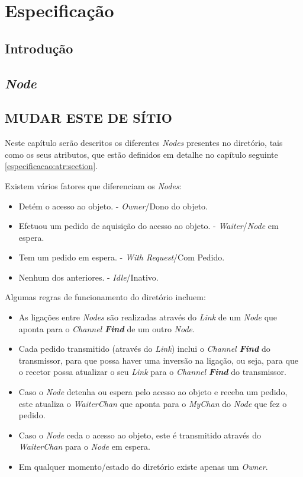 \chapter{Especificação}
\label{chap:especificacao}

\section{Introdução}
\label{especificacao:sec:intro}
\section{\emph{Node}}



\section{MUDAR ESTE DE SÍTIO}
Neste capítulo serão descritos os diferentes \emph{Nodes} presentes no diretório, tais como os seus atributos, 
que estão definidos em detalhe no capítulo seguinte \ref{especificacao:atr:section}.

Existem vários fatores que diferenciam os \emph{Nodes}: 
\begin{itemize}
    \item Detém o acesso ao objeto. - \emph{Owner}/Dono do objeto.
    \item Efetuou um pedido de aquisição do acesso ao objeto. - \emph{Waiter}/\emph{Node} em espera.
    \item Tem um pedido em espera. - \emph{With Request}/Com Pedido.
    \item Nenhum dos anteriores. - \emph{Idle}/Inativo.
\end{itemize}



Algumas regras de funcionamento do diretório incluem:

\begin{itemize}
    \item As ligações entre \emph{Nodes} são realizadas através do \emph{Link} de um \emph{Node}
    que aponta para o \emph{Channel \textbf{Find}} de um outro \emph{Node}.
    \item Cada pedido transmitido (através do \emph{Link}) inclui o \emph{Channel \textbf{Find}} do transmissor,   
    para que possa haver uma inversão na ligação, ou seja, para que o recetor possa atualizar 
    o seu \emph{Link} para o \emph{Channel \textbf{Find}} do transmissor.
    \item Caso o \emph{Node} detenha ou espera pelo acesso ao objeto e receba um pedido,
    este atualiza o \emph{WaiterChan} que aponta para o \emph{MyChan} do \emph{Node} que fez o pedido.
    \item Caso o \emph{Node} ceda o acesso ao objeto, este é transmitido através do \emph{WaiterChan} para o \emph{Node} em espera.
    \item Em qualquer momento/estado do diretório existe apenas um \emph{Owner}.
\end{itemize}


